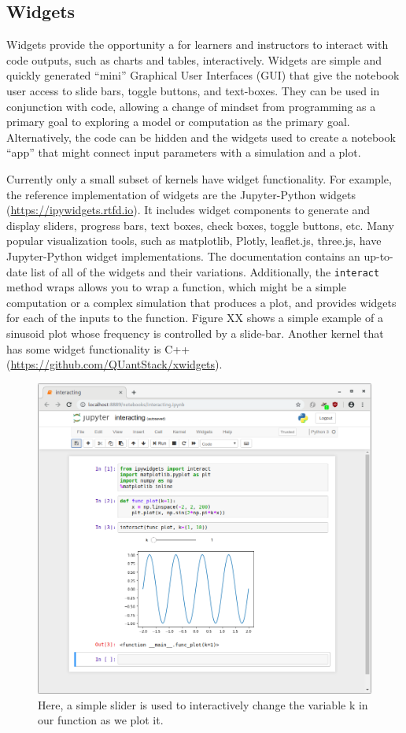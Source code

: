 \documentclass[]{book}
\begin{document}
\subsection{Widgets}\label{widgets}

Widgets provide the opportunity a for learners and instructors to
interact with code outputs, such as charts and tables, interactively.
Widgets are simple and quickly generated ``mini'' Graphical User
Interfaces (GUI) that give the notebook user access to slide bars,
toggle buttons, and text-boxes. They can be used in conjunction with
code, allowing a change of mindset from programming as a primary goal to
exploring a model or computation as the primary goal. Alternatively, the
code can be hidden and the widgets used to create a notebook ``app''
that might connect input parameters with a simulation and a plot.

Currently only a small subset of kernels have widget functionality. For
example, the reference implementation of widgets are the Jupyter-Python
widgets (\url{https://ipywidgets.rtfd.io}). It includes widget
components to generate and display sliders, progress bars, text boxes,
check boxes, toggle buttons, etc. Many popular visualization tools, such
as matplotlib, Plotly, leaflet.js, three.js, have Jupyter-Python widget
implementations. The documentation contains an up-to-date list of all of
the widgets and their variations. Additionally, the \texttt{interact}
method wraps allows you to wrap a function, which might be a simple
computation or a complex simulation that produces a plot, and provides
widgets for each of the inputs to the function. Figure XX shows a simple
example of a sinusoid plot whose frequency is controlled by a slide-bar.
Another kernel that has some widget functionality is C++
(\url{https://github.com/QUantStack/xwidgets}).

\begin{figure}
\centering
\includegraphics{images/notebook-matplotlib-interact.png}
\caption{Here, a simple slider is used to interactively change the
variable k in our function as we plot it.}
\end{figure}
\end{document}
